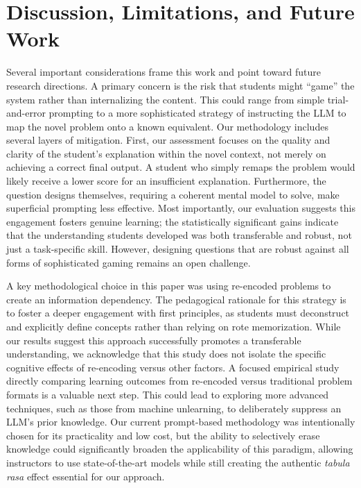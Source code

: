 \documentclass{article} %
\begin{document}
\section{Discussion, Limitations, and Future Work}
Several important considerations frame this work and point toward future research directions. A primary concern is the risk that students might ``game'' the system rather than internalizing the content. This could range from simple trial-and-error prompting to a more sophisticated strategy of instructing the LLM to map the novel problem onto a known equivalent. Our methodology includes several layers of mitigation. First, our assessment focuses on the quality and clarity of the student's explanation within the novel context, not merely on achieving a correct final output. A student who simply remaps the problem would likely receive a lower score for an insufficient explanation. Furthermore, the question designs themselves, requiring a coherent mental model to solve, make superficial prompting less effective. Most importantly, our evaluation suggests this engagement fosters genuine learning; the statistically significant gains indicate that the understanding students developed was both transferable and robust, not just a task-specific skill. However, designing questions that are robust against all forms of sophisticated gaming remains an open challenge.

A key methodological choice in this paper was using re-encoded problems to create an information dependency. The pedagogical rationale for this strategy is to foster a deeper engagement with first principles, as students must deconstruct and explicitly define concepts rather than relying on rote memorization. While our results suggest this approach successfully promotes a transferable understanding, we acknowledge that this study does not isolate the specific cognitive effects of re-encoding versus other factors. A focused empirical study directly comparing learning outcomes from re-encoded versus traditional problem formats is a valuable next step. This could lead to exploring more advanced techniques, such as those from machine unlearning, to deliberately suppress an LLM's prior knowledge. Our current prompt-based methodology was intentionally chosen for its practicality and low cost, but the ability to selectively erase knowledge could significantly broaden the applicability of this paradigm, allowing instructors to use state-of-the-art models while still creating the authentic {\em tabula rasa} effect essential for our approach.
\end{document}
